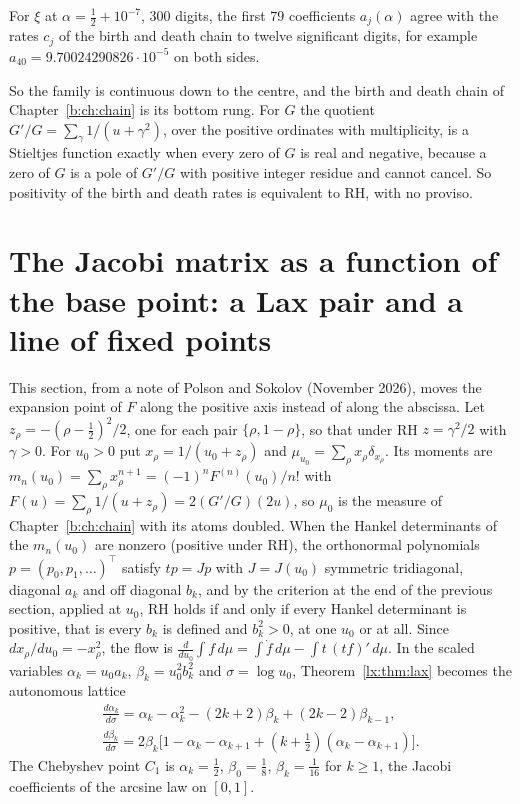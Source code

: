 \begin{computation}\label{h:comp:limit}
For $\xi$ at $\alpha=\frac12+10^{-7}$, $300$ digits, the first $79$ coefficients $a_j(\alpha)$ agree with the rates $c_j$ of the birth and death chain to twelve significant digits, for example $a_{40}=9.70024290826\cdot10^{-5}$ on both sides. %
\end{computation}

So the family is continuous down to the centre, and the birth and death chain of Chapter~\ref{b:ch:chain} is its bottom rung. For $G$ the quotient $G'/G=\sum_\gamma1/(u+\gamma^2)$, over the positive ordinates with multiplicity, is a Stieltjes function exactly when every zero of $G$ is real and negative, because a zero of $G$ is a pole of $G'/G$ with positive integer residue and cannot cancel. So positivity of the birth and death rates is equivalent to RH, with no proviso.

\section{The Jacobi matrix as a function of the base point: a Lax pair and a line of fixed points}\label{lx:sec:lax}

This section, from a note of Polson and Sokolov (November 2026), moves the expansion point of $F$ along the positive axis instead of along the abscissa. Let $z_\rho=-(\rho-\frac12)^2/2$, one for each pair $\{\rho,1-\rho\}$, so that under RH $z=\gamma^2/2$ with $\gamma>0$. For $u_0>0$ put $x_\rho=1/(u_0+z_\rho)$ and $\mu_{u_0}=\sum_\rho x_\rho\delta_{x_\rho}$. Its moments are $m_n(u_0)=\sum_\rho x_\rho^{n+1}=(-1)^nF^{(n)}(u_0)/n!$ with $F(u)=\sum_\rho1/(u+z_\rho)=2(G'/G)(2u)$, so $\mu_0$ is the measure of Chapter~\ref{b:ch:chain} with its atoms doubled. When the Hankel determinants of the $m_n(u_0)$ are nonzero (positive under RH), the orthonormal polynomials $p=(p_0,p_1,\dots)^{\top}$ satisfy $tp=Jp$ with $J=J(u_0)$ symmetric tridiagonal, diagonal $a_k$ and off diagonal $b_k$, and by the criterion at the end of the previous section, applied at $u_0$, RH holds if and only if every Hankel determinant is positive, that is every $b_k$ is defined and $b_k^2>0$, at one $u_0$ or at all. Since $dx_\rho/du_0=-x_\rho^2$, the flow is $\frac{d}{du_0}\int f\,d\mu=\int\dot f\,d\mu-\int t\,(tf)'\,d\mu$. In the scaled variables $\alpha_k=u_0a_k$, $\beta_k=u_0^2b_k^2$ and $\sigma=\log u_0$, Theorem~\ref{lx:thm:lax} becomes the autonomous lattice
\begin{gather*}
\frac{d\alpha_k}{d\sigma}=\alpha_k-\alpha_k^2-(2k+2)\beta_k+(2k-2)\beta_{k-1},\\
\frac{d\beta_k}{d\sigma}=2\beta_k\bigl[1-\alpha_k-\alpha_{k+1}+(k+\tfrac12)(\alpha_k-\alpha_{k+1})\bigr].
\end{gather*}
The Chebyshev point $C_1$ is $\alpha_k=\frac12$, $\beta_0=\frac18$, $\beta_k=\frac1{16}$ for $k\ge1$, the Jacobi coefficients of the arcsine law on $[0,1]$.


